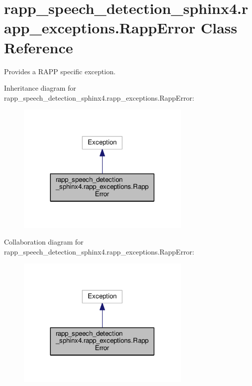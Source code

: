 \hypertarget{classrapp__speech__detection__sphinx4_1_1rapp__exceptions_1_1RappError}{\section{rapp\-\_\-speech\-\_\-detection\-\_\-sphinx4.\-rapp\-\_\-exceptions.\-Rapp\-Error Class Reference}
\label{classrapp__speech__detection__sphinx4_1_1rapp__exceptions_1_1RappError}
}


Provides a R\-A\-P\-P specific exception.  




Inheritance diagram for rapp\-\_\-speech\-\_\-detection\-\_\-sphinx4.\-rapp\-\_\-exceptions.\-Rapp\-Error\-:
\nopagebreak
\begin{figure}[H]
\begin{center}
\leavevmode
\includegraphics[width=236pt]{classrapp__speech__detection__sphinx4_1_1rapp__exceptions_1_1RappError__inherit__graph}
\end{center}
\end{figure}


Collaboration diagram for rapp\-\_\-speech\-\_\-detection\-\_\-sphinx4.\-rapp\-\_\-exceptions.\-Rapp\-Error\-:
\nopagebreak
\begin{figure}[H]
\begin{center}
\leavevmode
\includegraphics[width=236pt]{classrapp__speech__detection__sphinx4_1_1rapp__exceptions_1_1RappError__coll__graph}
\end{center}
\end{figure}
